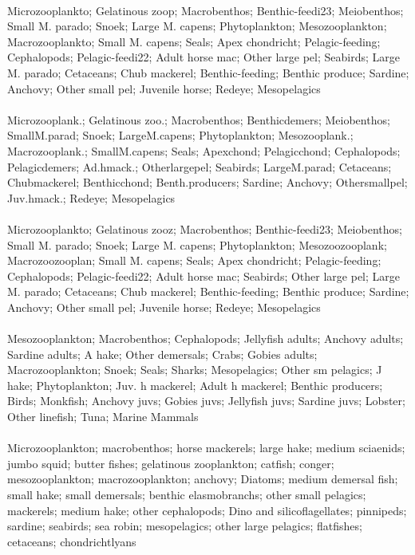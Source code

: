 \fullhline
\hline
{} \\
\hline
Microzooplankto; Gelatinous zoop; Macrobenthos; Benthic-feedi23; Meiobenthos; Small M. parado; Snoek; Large M. capens; Phytoplankton; Mesozooplankton; Macrozooplankto; Small M. capens; Seals; Apex chondricht; Pelagic-feeding; Cephalopods; Pelagic-feedi22; Adult horse mac; Other large pel; Seabirds; Large M. parado; Cetaceans; Chub mackerel; Benthic-feeding; Benthic produce; Sardine; Anchovy; Other small pel; Juvenile horse; Redeye; Mesopelagics\\
\fullhline
\hline
{} \\
\hline
Microzooplank.; Gelatinous zoo.; Macrobenthos; Benthicdemers; Meiobenthos; SmallM.parad; Snoek; LargeM.capens; Phytoplankton; Mesozooplank.; Macrozooplank.; SmallM.capens; Seals; Apexchond; Pelagicchond; Cephalopods; Pelagicdemers; Ad.hmack.; Otherlargepel; Seabirds; LargeM.parad; Cetaceans; Chubmackerel; Benthicchond; Benth.producers; Sardine; Anchovy; Othersmallpel; Juv.hmack.; Redeye; Mesopelagics\\
\fullhline
\hline
{} \\
\hline
Microzooplankto; Gelatinous zooz; Macrobenthos; Benthic-feedi23; Meiobenthos; Small M. parado; Snoek; Large M. capens; Phytoplankton; Mesozoozooplank; Macrozoozooplan; Small M. capens; Seals; Apex chondricht; Pelagic-feeding; Cephalopods; Pelagic-feedi22; Adult horse mac; Seabirds; Other large pel; Large M. parado; Cetaceans; Chub mackerel; Benthic-feeding; Benthic produce; Sardine; Anchovy; Other small pel; Juvenile horse; Redeye; Mesopelagics\\
\fullhline
\hline
{} \\
\hline
Mesozooplankton; Macrobenthos; Cephalopods; Jellyfish adults; Anchovy adults; Sardine adults; A hake; Other demersals; Crabs; Gobies adults; Macrozooplankton; Snoek; Seals; Sharks; Mesopelagics; Other sm pelagics; J hake; Phytoplankton; Juv. h mackerel; Adult h mackerel; Benthic producers; Birds; Monkfish; Anchovy juvs; Gobies juvs; Jellyfish juvs; Sardine juvs; Lobster; Other linefish; Tuna; Marine Mammals\\
\fullhline
\hline
{} \\
\hline
Microzooplankton; macrobenthos; horse mackerels; large hake; medium sciaenids; jumbo squid; butter fishes; gelatinous zooplankton; catfish; conger; mesozooplankton; macrozooplankton; anchovy; Diatoms; medium demersal fish; small hake; small demersals; benthic elasmobranchs; other small pelagics; mackerels; medium hake; other cephalopods; Dino and silicoflagellates; pinnipeds; sardine; seabirds; sea robin; mesopelagics; other large pelagics; flatfishes; cetaceans; chondrichtlyans\\
